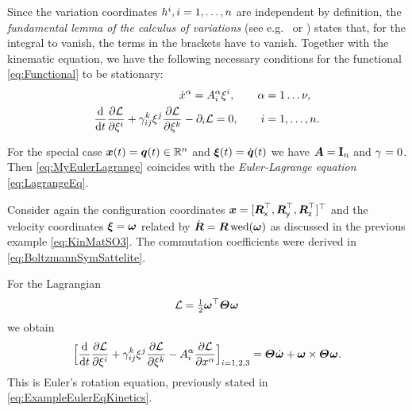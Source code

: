 Since the variation coordinates $\varCoordCoeff{\LidxI}, i=1,\ldots,\dimConfigSpace$ are independent by definition, the \textit{fundamental lemma of the calculus of variations} (see e.g.\ \cite[p.\,166]{CourantHilbert1} or \cite[p.\,57]{Arnold:MathematicalMethodsOfClassicalMechanics}) states that, for the integral to vanish, the terms in the brackets have to vanish.
Together with the kinematic equation, we have the following necessary conditions for the functional \eqref{eq:Functional} to be stationary:
\begin{subequations}\label{eq:MyEulerLagrange}
\begin{align}
 \sysCoordCoeffd{\GidxI} = \kinMatCoeff{\GidxI}{\LidxI} \sysVelCoeff{\LidxI}, \qquad
 \GidxI &= 1\ldots\numCoord,
\\
 \diff{t} \pdiff[\Lagrangian]{\sysVelCoeff{\LidxI}} + \BoltzSym{\LidxIII}{\LidxI}{\LidxII} \sysVelCoeff{\LidxII} \pdiff[\Lagrangian]{\sysVelCoeff{\LidxIII}} - \dirDiff{\LidxI}\Lagrangian = 0, \qquad
 \LidxI &= 1,\ldots,\dimConfigSpace.
\end{align}
\end{subequations}

For the special case $\sysCoord(t)=\genCoord(t)\in\RealNum^\dimConfigSpace$ and $\sysVel(t)=\genCoordd(t)$ we have $\kinMat=\idMat[\dimConfigSpace]$ and $\BoltzSym{}{}{}=0$.
Then \eqref{eq:MyEulerLagrange} coincides with the \textit{Euler-Lagrange equation} \eqref{eq:LagrangeEq}.

\begin{Example}
Consider again the configuration coordinates $\sysCoord = [\Rx^\top, \Ry^\top, \Rz^\top]^\top$ and the velocity coordinates $\sysVel = \w$ related by $\Rd = \R \wedOp(\w)$ as discussed in the previous example \eqref{eq:KinMatSO3}.
The commutation coefficients were derived in \eqref{eq:BoltzmannSymSattelite}.

For the Lagrangian 
\begin{align}
\Lagrangian = \tfrac{1}{2} \w^\top \bodyMOI{}{} \w 
\end{align}
we obtain
\begin{align}
 \Big[ \diff{t} \pdiff[\Lagrangian]{\sysVelCoeff{\LidxI}} + \BoltzSym{\LidxIII}{\LidxI}{\LidxII} \sysVelCoeff{\LidxII} \pdiff[\Lagrangian]{\sysVelCoeff{\LidxIII}} - \kinMatCoeff{\GidxI}{\LidxI} \pdiff[\Lagrangian]{\sysCoordCoeff{\GidxI}} \Big]_{\LidxI=1,2,3}
 = \bodyMOI{}{} \wdot + \w \times \bodyMOI{}{} \w
 .
\end{align}
This is Euler's rotation equation, previously stated in \eqref{eq:ExampleEulerEqKinetics}.
\end{Example}



